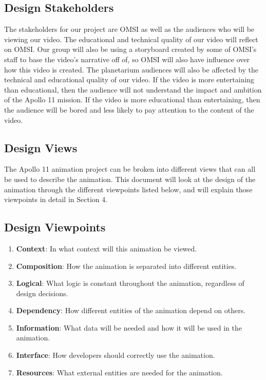 \documentclass[onecolumn, draftclsnofoot,10pt, compsoc]{IEEEtran}
\begin{document}
    \subsection{Design Stakeholders}
    The stakeholders for our project are OMSI as well as the audiences who will be viewing our video. The educational and technical quality of our video will reflect on OMSI. Our group will also be using a storyboard created by some of OMSI's staff to base the video's narrative off of, so OMSI will also have influence over how this video is created. The planetarium audiences will also be affected by the technical and educational quality of our video. If the video is more entertaining than educational, then the audience will not understand the impact and ambition of the Apollo 11 mission. If the video is more educational than entertaining, then the audience will be bored and less likely to pay attention to the content of the video.
    
\subsection{Design Views}
    The Apollo 11 animation project can be broken into different views that can all be used to describe the animation. This document will look at the design of the animation through the different viewpoints listed below, and will explain those viewpoints in detail in Section 4. 
    
    \subsection{Design Viewpoints}
    \begin{enumerate}
        \item \textbf{Context}: In what context will this animation be viewed.
        \item \textbf{Composition}: How the animation is separated into different entities.
        \item \textbf{Logical}: What logic is constant throughout the animation, regardless of design decisions.
        \item \textbf{Dependency}: How different entities of the animation depend on others.
        \item \textbf{Information}: What data will be needed and how it will be used in the animation. 
        \item \textbf{Interface}: How developers should correctly use the animation.
        \item \textbf{Resources}: What external entities are needed for the animation. 
    \end{enumerate}
    
\end{document}
